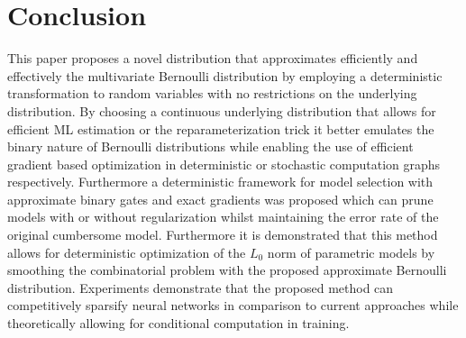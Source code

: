 \documentclass[final,1p,times]{elsarticle}
\begin{document}
\section{Conclusion}
This paper proposes a novel distribution that approximates efficiently and effectively the multivariate Bernoulli distribution by employing a deterministic transformation to random variables with no restrictions on the underlying distribution. By choosing a continuous underlying distribution that allows for efficient ML estimation or the reparameterization trick it better emulates the binary nature of Bernoulli distributions while enabling the use of efficient gradient based optimization in deterministic or stochastic computation graphs respectively. Furthermore a deterministic framework for model selection with approximate binary gates and exact gradients was proposed which can prune models with or without regularization whilst maintaining the error rate of the original cumbersome model. Furthermore it is demonstrated that this method allows for deterministic optimization of the $L_0$ norm of parametric models by smoothing the combinatorial problem with the proposed approximate Bernoulli distribution. Experiments demonstrate that the proposed method can competitively sparsify neural networks in comparison to current approaches while theoretically allowing for conditional computation in training.




\end{document}
